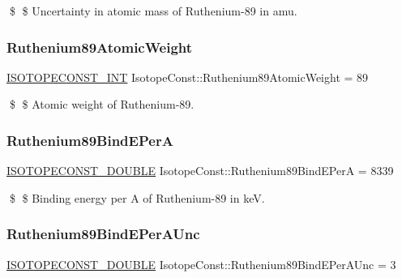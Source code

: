\$ \$ Uncertainty in atomic mass of Ruthenium-\/89 in amu. \mbox{\label{group___isotope_const-_ruthenium-_ru89_gad777b961c2061da26df13c1b0f1cac62}} 
\subsubsection{\texorpdfstring{Ruthenium89\+Atomic\+Weight}{Ruthenium89AtomicWeight}}
{\footnotesize\ttfamily \mbox{\hyperlink{group___isotope_const-_macros_ga5f18360b3e99483a35c32d789e62621c}{I\+S\+O\+T\+O\+P\+E\+C\+O\+N\+S\+T\+\_\+\+I\+NT}} Isotope\+Const\+::\+Ruthenium89\+Atomic\+Weight = 89}

\$ \$ Atomic weight of Ruthenium-\/89. \mbox{\label{group___isotope_const-_ruthenium-_ru89_ga42bd938299e1b247a60743ed955b0fb0}} 
\subsubsection{\texorpdfstring{Ruthenium89\+Bind\+E\+PerA}{Ruthenium89BindEPerA}}
{\footnotesize\ttfamily \mbox{\hyperlink{group___isotope_const-_macros_ga8f45a7272ce02c0b4c65c44636ed719a}{I\+S\+O\+T\+O\+P\+E\+C\+O\+N\+S\+T\+\_\+\+D\+O\+U\+B\+LE}} Isotope\+Const\+::\+Ruthenium89\+Bind\+E\+PerA = 8339}

\$ \$ Binding energy per A of Ruthenium-\/89 in keV. \mbox{\label{group___isotope_const-_ruthenium-_ru89_gad4267160bd776f059aaf279b14da9032}} 
\subsubsection{\texorpdfstring{Ruthenium89\+Bind\+E\+Per\+A\+Unc}{Ruthenium89BindEPerAUnc}}
{\footnotesize\ttfamily \mbox{\hyperlink{group___isotope_const-_macros_ga8f45a7272ce02c0b4c65c44636ed719a}{I\+S\+O\+T\+O\+P\+E\+C\+O\+N\+S\+T\+\_\+\+D\+O\+U\+B\+LE}} Isotope\+Const\+::\+Ruthenium89\+Bind\+E\+Per\+A\+Unc = 3}

